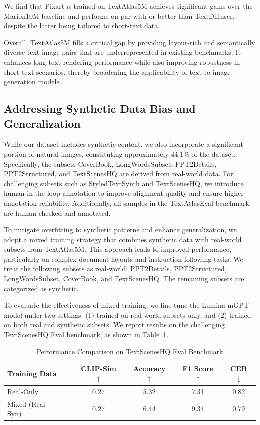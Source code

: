 We find that Pixart-$\alpha$ trained on TextAtlas5M achieves significant gains over the Marion10M baseline and performs on par with or better than TextDiffuser, despite the latter being tailored to short-text data.

Overall, TextAtlas5M fills a critical gap by providing layout-rich and semantically diverse text-image pairs that are underrepresented in existing benchmarks. 
It enhances long-text rendering performance while also improving robustness in short-text scenarios, thereby broadening the applicability of text-to-image generation models.



\subsection{Addressing Synthetic Data Bias and Generalization}
While our dataset includes synthetic content, we also incorporate a significant portion of natural images, constituting approximately 44.1\% of the dataset. 
Specifically, the subsets CoverBook, LongWordsSubset, PPT2Details, PPT2Structured, and TextScenesHQ are derived from real-world data. For challenging subsets such as StyledTextSynth and TextScenesHQ, we introduce human-in-the-loop annotation to improve alignment quality and ensure higher annotation reliability. Additionally, all samples in the TextAtlasEval benchmark are human-checked and annotated.

To mitigate overfitting to synthetic patterns and enhance generalization, we adopt a mixed training strategy that combines synthetic data with real-world subsets from TextAtlas5M. This approach leads to improved performance, particularly on complex document layouts and instruction-following tasks. We treat the following subsets as real-world: PPT2Details, PPT2Structured, LongWordsSubset, CoverBook, and TextScenesHQ. The remaining subsets are categorized as synthetic.

To evaluate the effectiveness of mixed training, we fine-tune the Lumina-mGPT model under two settings: (1) trained on real-world subsets only, and (2) trained on both real and synthetic subsets. We report results on the challenging TextScenesHQ Eval benchmark, as shown in Table~\ref{tab:mixed_training_results}.

\begin{table}[h]
\centering
\caption{Performance Comparison on TextScenesHQ Eval Benchmark}
\label{tab:mixed_training_results}
\begin{tabular}{l c c c c}
\hline
\textbf{Training Data} & \textbf{CLIP-Sim} $\uparrow$ & \textbf{Accuracy} $\uparrow$ & \textbf{F1 Score} $\uparrow$ & \textbf{CER} $\downarrow$ \\
\hline
Real-Only & 0.27 & 5.32 & 7.31 & 0.82 \\
Mixed (Real + Syn) & 0.27 & 6.44 & 9.34 & 0.79 \\
\hline
\end{tabular}
\end{table}


